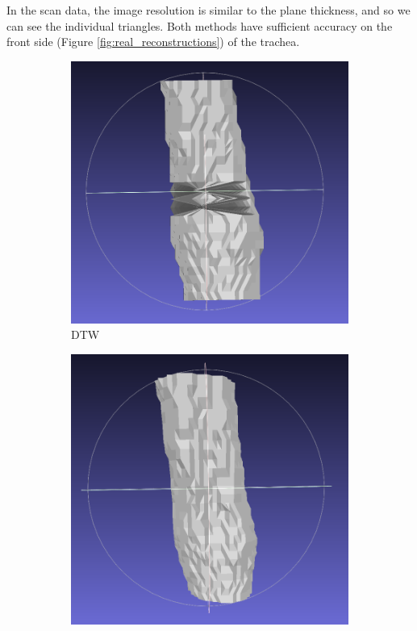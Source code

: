 \documentclass[11p, titlepage]{article}
\begin{document}
In the scan data, the image resolution is similar to the plane thickness, and so we can see the individual triangles. Both methods have sufficient accuracy on the front side (Figure \ref{fig:real_reconstructions}) of the trachea.

\begin{figure}[h!]
     \centering
     \begin{subfigure}[b]{0.45\textwidth}
         \centering
         \includegraphics[width=\textwidth]{reconstructions/dtw-real-back}
         \caption{DTW}
         \label{fig:dtw_real_back}
     \end{subfigure}
     \hfill
     \begin{subfigure}[b]{0.45\textwidth}
         \centering
         \includegraphics[width=\textwidth]{reconstructions/cspa50-real-back}

\end{subfigure}
\end{figure}
\end{document}
